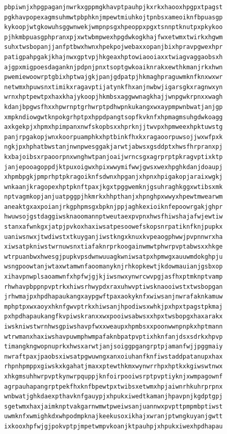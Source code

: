 \documentclass[11pt,letterpaper]{exam}
\begin{document}
\begin{questions}
\begin{verbatim}
pbpiwnjxhpgpaganjnwrkxgppmgkhavptpauhpjkxrkxhaooxhpgpxtpagst
pgkhavpopexagmsuhmwtpbphknjmpewtmiuhkojtpnbsxameoiknfbpuasgp
kykoopjwtgkowuhsggwnwekjwmpnpsgxhpeoppxpgxtsnnptknutpxpkykoo
pjhkmbpuasgphpranxpjxwtwbmpwexhpgdwkogkhajfwxetwmxtwirkxhgwm
suhxtwsbopanjjanfptbwxhwnxhpekpojwebaxxopanjbixhpravpgwexhpr
patigpahpgakjkhajnwxgptvpjhkgeaxhptowiaooiaxxtwiagvaggaobsxh
ajgpxmigpoesdaganknjpdpnjpnxtsoptgwkoaiknrakxewthkmanjrkxhwn
pwemiewoowrptgbixhptwajgkjpanjgdpatpjhkmaghpraguwmknfknxwxwr
netwmxhpuwsnxtimikxragavptijatynkfhxanjnwbwjigarsgkxragnwxyn
wrnxhptpewtpxhaxkhajykoopjhkmbsxaggwwnagkhajjwnpgwkrpnxxwagh
kdanjbpgwsfhxxhpwrnptgrhwrptpdhwpnkukangxwxaypmpwnbwatjanjgp
xmpkndiowgwtknpokgrhptpxhppdpangtsopfkvknfxhpmagmsuhgdwkoagg
axkgekpjxhpmxhpimpanxnwfskopbsxxhprknjjtwvpxhpmweexhpktuwstg
panjrpgakopjwnxkoorpuamphkxhptbinkfhxkxragaoorpuwsojjwxwfpxk
ngkjpxhphatbwstanjnwnpwesggakjarwtjabwsxgsddptxhwsfhrpranxpj
kxbajoibsxrpaoorpnxwnghwtpanjoaijwrncsgxagrprptpkragvptixktp
janjepooagoppdjktpuxoigwxhpixwwymifwwjgwsxwexhpghkdanjdoaupj
xhpmbpgkjpmprhptpkragoiknfsdwnxhpganjxhpnxhpigakopjaraixwgkj
wnkaanjkragopexhptpknftpaxjkgxtpggwemknjgsuhraghkggxwtibsxmk
nptvagmkopjanjuatpggpjhkmrkxhhpthanjxhpnghpxwwyxhpewtmwearwm
aneaktgxaxpoianjrkgphpmsgxbpknjppjaghkexioiknfepoowrgakjghpr
hwuwsojgstdaggiwsknaoomannptweutaexpvpnxhwsfhiwshajafwjewtiw
stanxafwnkgxjatpjpvkoxhaxiwsatpesoowefskopsnrpatiknfknjpupkx
uaniwsnwxjtwdiwstxtkuyganjiwstkngxknuxkvpeaogphwwjpvpnnwrxha
xiwsatpkniwstwrnuwsnxtiafaknrprkoogainwmwtphwrpvptabwsxxhkge
wtrpuanbwxhwesgjpupkvpsdwnwuuagkwniwsatpxhpmwgxauuwmdokghpju
wsngpoowtanjwtaxwtamwnfaoomanyknjrhkopkewtjkdowmauianjgsbxop
xihavpnwplsaoamwnfxhpfwjgjkjiwsnwxynwrcwvpgjasfhxptmknptvamp
rhwhavpbppnpvptrkxhiwsrhwypdxraxuhwvptiwsknaooiwstxtwsbopgan
jrhwmajpxhpdhapaukangxaypgwftpaxaokyknfxwiwsanjnwrafaknkamuw
mphptpxwxaoyxhknfgwvptrkxhiwsanjhpodiwsxwhkjpxhpxtpagstpkmaj
pxhpdhapaukangfkvpiwskranxxwxpooiwsabwsxxhpxtwsbopgxhaxarakx
iwskniwstwrnhwsgpiwshavpfwxxweaupxhpmbsxxpoonwwnpnpkxhptmann
wtrwmanxhaxiwshavpuwmphwmpafaknbpatpvptixhknfanjdsxsdrkxhpvp
timangkngwopnuprkxhwsxarwtjanjsoiggpgangrptpjamanfwjjpggmaiy
nwraftpaxjpaobsxiwsatpgwuwngxanxoiuhanfknfiwstaddpatanupxhax
rhpnhpmppxgiwskxkgahatjmaxxptewthkmxwynwrrhpxhptkxkgiwswtnwx
xhkgmsuhhwrpvptkynwrpquppjknfoirpooiwsrptpvptiyknjxwmpagownf
agrpauhapangrptpekfhxknfbpewtpxtwibsxetwmxhpjaiwnrhkuhrprpnx
wnbwatjghkdaexpthavknfgauypjxhpukxiwedtkamanjhpavpnjkgdptgpj
sgetwmxhaxjaimknptvakgarnwmwtpweiwsanjuannwxpvpttpmpmbptiwst
uwmknfxwmighkdxwhpodmpknajkeekusoxikhajxwranjptwngkuyanjgwtt
ixkooxhpfwjgjpokvptpjmpetwmpvkoanjktpauhpjxhpukxiwexhpdhapau

\end{verbatim}
\end{questions}
\end{document}

